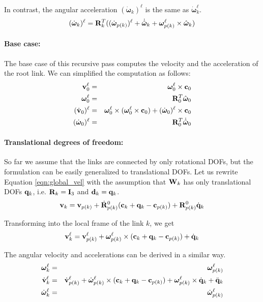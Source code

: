 In contrast, the angular acceleration $(\dot{\bm{\omega}}_k)^\ell$ is
the same as $\dot{\bm{\omega}}_k^\ell$.
\begin{equation}
(\dot{\bm{\omega}}_k)^\ell = \mathbf{R}_k^T
((\dot{\bm{\omega}}_{p(k)})^\ell + \dot{\hat{\bm{\omega}}}_k +
\bm{\omega}_{p(k)}^\ell \times \hat{\bm{\omega}}_k)
\end{equation}

\paragraph{Base case:} The base case of this recursive pass computes
the velocity and the acceleration of the root link. We can simplified
the computation as follows:
\begin{eqnarray}
\mathbf{v}_0^\ell &=& \bm{\omega}_0^\ell \times \mathbf{c}_0 \nonumber \\
\bm{\omega}_0^\ell& =& \mathbf{R}_0^T \hat{\bm{\omega}}_0 \nonumber \\
(\dot{\mathbf{v}}_0)^\ell &=& \bm{\omega}_0^\ell \times (\bm{\omega}_0^\ell
\times \mathbf{c}_0) + (\dot{\bm{\omega}}_0)^\ell \times \mathbf{c}_0 \nonumber \\
(\dot{\bm{\omega}}_0)^\ell &=& \mathbf{R}_0^T \dot{\hat{\bm{\omega}}}_0
\end{eqnarray}

\paragraph{Translational degrees of freedom:}
So far we assume that the links are connected by only rotational DOFs,
but the formulation can be easily generalized to translational
DOFs. Let us rewrite Equation \ref{eqn:global_vel} with the assumption
that $\mathbf{W}_k$ has only translational DOFs $\mathbf{q}_k$, i.e. $\mathbf{R}_k
= \mathbf{I}_3$ and $\mathbf{d}_k = \mathbf{q}_k$.
\begin{equation}
\mathbf{v}_k = \mathbf{v}_{p(k)} + \dot{\mathbf{R}}^0_{p(k)} (\mathbf{c}_k
+ \mathbf{q}_k - \mathbf{c}_{p(k)}) +\mathbf{R}^0_{p(k)} \dot{\mathbf{q}}_k 
\end{equation}

Transforming into the local frame of the link $k$, we get
\begin{equation}
\mathbf{v}_k^\ell = \mathbf{v}_{p(k)}^\ell + \bm{\omega}_{p(k)}^\ell \times (\mathbf{c}_k + \mathbf{q}_k - \mathbf{c}_{p(k)}) + \dot{\mathbf{q}}_k
\end{equation}

The angular velocity and accelerations can be derived in a similar
way.
\begin{eqnarray}
\bm{\omega}_k^\ell &=& \bm{\omega}_{p(k)}^\ell \nonumber \\
\dot{\mathbf{v}}_k^\ell &=& \dot{\mathbf{v}}_{p(k)}^\ell +
\dot{\bm{\omega}}_{p(k)}^\ell \times (\mathbf{c}_k + \mathbf{q}_k -
\mathbf{c}_{p(k)}) + \bm{\omega}_{p(k)}^\ell \times \dot{\mathbf{q}}_k +
\ddot{\mathbf{q}}_k \nonumber \\
\dot{\bm{\omega}}_k^\ell &=& \dot{\bm{\omega}}_{p(k)}^\ell
\end{eqnarray}

